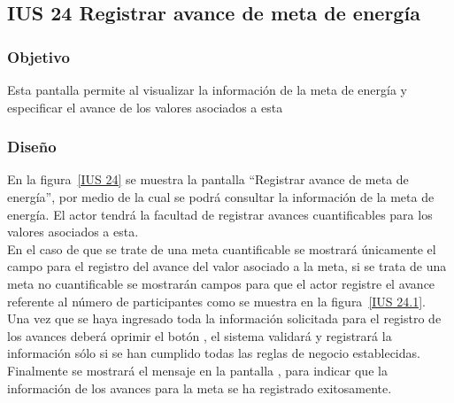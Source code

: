 \subsection{IUS 24 Registrar avance de meta de energía}

\subsubsection{Objetivo}

    Esta pantalla permite al  visualizar la información de la meta de energía y especificar el avance de los valores asociados a esta
    
\subsubsection{Diseño}

        En la figura~\ref{IUS 24} se muestra la pantalla ``Registrar avance de meta de energía'', por medio de la cual se podrá consultar la información de la meta de energía. El actor tendrá la facultad de registrar avances cuantificables para los valores asociados a esta.\\
        
        En el caso de que se trate de una meta cuantificable se mostrará únicamente el campo para el registro del avance del valor asociado a la meta, si se trata de una meta no cuantificable se mostrarán campos para que el actor registre el avance referente al número de participantes como se muestra en la figura~\ref{IUS 24.1}.\\
        
        Una vez que se haya ingresado toda la información solicitada para el registro de los avances deberá oprimir el botón , el sistema validará y registrará la información sólo si se han cumplido todas las reglas de negocio establecidas.\\
    
      Finalmente se mostrará el mensaje  en la pantalla , para indicar que la información de los avances para la meta se ha registrado exitosamente.
        

